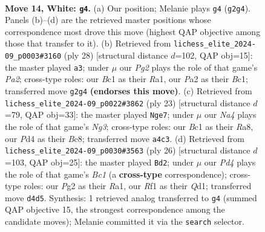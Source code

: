 \documentclass[11pt]{article}
\begin{document}
\begin{figure}[p]
\label{fig:thought-m24}
\end{figure}

\clearpage

\begin{figure}[p]\centering
\begin{subfigure}{0.46\textwidth}\centering
\resizebox{\linewidth}{!}{%
\newchessgame
\chessboard[
  setfen={r1b4r/p2nkppp/2pbpn2/q7/Np1P1P1N/3BP3/PP4PP/R1BQ1RK1 w - - 1 14},
  showmover=false,
  pgfstyle=straightmove, color=movearrow, markmove={g2-g4}
]}
\caption{}
\end{subfigure}\hfill
\begin{subfigure}{0.46\textwidth}\centering
\resizebox{\linewidth}{!}{%
\newchessgame
\chessboard[
  setfen={3qkb1r/1r3ppp/1np1p3/p2n4/1p1P4/3N1B2/PPP2PPP/R1BQ1RK1 w k - 0 15},
  showmover=false,
  pgfstyle=straightmove, color=movearrow, markmove={a2-a3}
]}
\caption{}
\end{subfigure}
\\[4pt]
\begin{subfigure}{0.46\textwidth}\centering
\resizebox{\linewidth}{!}{%
\newchessgame
\chessboard[
  setfen={r1bq1rk1/ppp3pp/2np2n1/5p1P/1b2PP2/2N3Q1/PPPB2P1/2KR1BNR b - - 0 12},
  showmover=false,
  pgfstyle=straightmove, color=movearrow, markmove={g6-e7}
]}
\caption{}
\end{subfigure}\hfill
\begin{subfigure}{0.46\textwidth}\centering
\resizebox{\linewidth}{!}{%
\newchessgame
\chessboard[
  setfen={2r1kb1r/1p1b1n1p/1qn1pp2/pN1p4/P2P2P1/5N1P/1P3P2/R1BQKB1R w KQk - 4 14},
  showmover=false,
  pgfstyle=straightmove, color=movearrow, markmove={c1-d2}
]}
\caption{}
\end{subfigure}
\caption{\textbf{Move 14, White: \texttt{g4}.} (a) Our position; Melanie plays \texttt{g4} (\texttt{g2g4}). Panels (b)--(d) are the retrieved master positions whose correspondence most drove this move (highest QAP objective among those that transfer to it). (b) Retrieved from \texttt{lichess\_elite\_2024-09\_p0003\#3160} (ply 28) [structural distance $d$=102, QAP obj=15]: the master played \texttt{a3}; under $\mu$ our \emph{Pg2} plays the role of that game's \emph{Pa2}; cross-type roles: our \emph{B}c1 as their \emph{R}a1, our \emph{P}a2 as their \emph{B}c1; transferred move \texttt{g2g4} \textbf{(endorses this move)}. (c) Retrieved from \texttt{lichess\_elite\_2024-09\_p0022\#3862} (ply 23) [structural distance $d$=79, QAP obj=33]: the master played \texttt{Nge7}; under $\mu$ our \emph{Na4} plays the role of that game's \emph{Ng3}; cross-type roles: our \emph{B}c1 as their \emph{R}a8, our \emph{P}d4 as their \emph{B}c8; transferred move \texttt{a4c3}. (d) Retrieved from \texttt{lichess\_elite\_2024-09\_p0030\#3563} (ply 26) [structural distance $d$=103, QAP obj=25]: the master played \texttt{Bd2}; under $\mu$ our \emph{Pd4} plays the role of that game's \emph{Bc1} (a \textbf{cross-type} correspondence); cross-type roles: our \emph{P}g2 as their \emph{R}a1, our \emph{R}f1 as their \emph{Q}d1; transferred move \texttt{d4d5}. Synthesis: 1 retrieved analog transferred to \texttt{g4} (summed QAP objective 15, the strongest correspondence among the candidate moves); Melanie committed it via the \texttt{search} selector.}

\end{figure}
\end{document}
